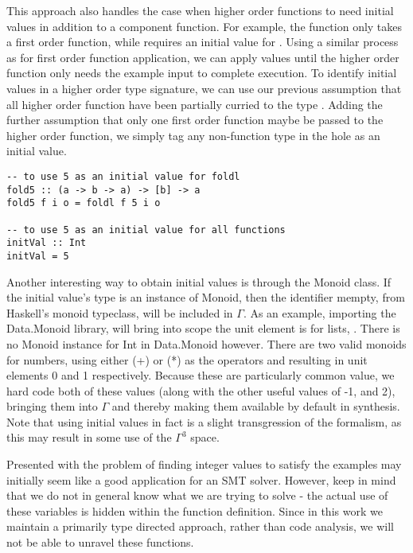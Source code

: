 This approach also handles the case when higher order functions to need initial values in addition to a component function.
For example, the  function only takes a first order function, while  requires an initial value for .
Using a similar process as for first order function application, we can apply values until the higher order function only needs the example input to complete execution.
To identify initial values in a higher order type signature, we can use our previous assumption that all higher order function have been partially curried to the type \codeinline{_ -> *-> *}. 
Adding the further assumption that only one first order function maybe be passed to the higher order function, we simply tag any non-function type in the hole as an initial value.

\begin{lstlisting}[caption=adding default initial values]
-- to use 5 as an initial value for foldl
fold5 :: (a -> b -> a) -> [b] -> a
fold5 f i o = foldl f 5 i o

-- to use 5 as an initial value for all functions
initVal :: Int
initVal = 5
\end{lstlisting}

Another interesting way to obtain initial values is through the Monoid class.
If the initial value's type is an instance of Monoid, then the identifier mempty, from Haskell's monoid typeclass\cite{monoid}, will be included in $\Gamma$.
As an example, importing the Data.Monoid library, will bring into scope the unit element is for lists, .
There is no Monoid instance for Int in Data.Monoid however. 
There are two valid monoids for numbers, using either (+) or (*) as the operators and resulting in unit elements 0 and 1 respectively. 
Because these are particularly common value,  we hard code both of these values (along with the other useful values of -1, and 2), bringing them into $\Gamma$ and thereby making them available by default in synthesis.
Note that using initial values in fact is a slight transgression of the formalism, as this may result in some use of the $\Gamma^3$ space.

Presented with the problem of finding integer values to satisfy the examples may initially seem like a good application for an SMT solver.
However, keep in mind that we do not in general know what we are trying to solve - the actual use of these variables is hidden within the function definition.
Since in this work we maintain a primarily type directed approach, rather than code analysis, we will not be able to unravel these functions.


